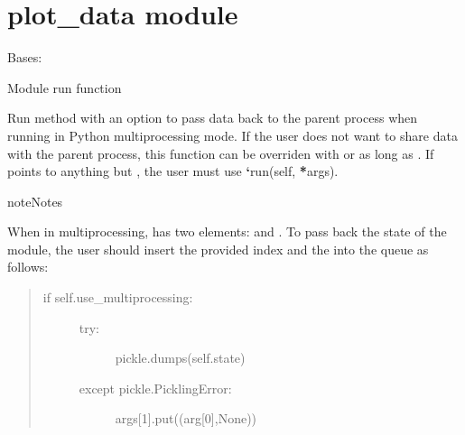 \documentclass[letterpaper,10pt,openany,oneside,english]{sphinxmanual}
\begin{document}
\section{plot\_data module}
\label{\detokenize{examples_rst/plot_data:module-plot_data}}\label{\detokenize{examples_rst/plot_data:plot-data-module}}\label{\detokenize{examples_rst/plot_data::doc}}

\begin{fulllineitems}
\label{\detokenize{examples_rst/plot_data:plot_data.PlotData}}
Bases: 

\begin{fulllineitems}
\label{\detokenize{examples_rst/plot_data:plot_data.PlotData.run}}
Module run function

Run method with an option to pass data back to the parent process when running
in Python multiprocessing mode. If the user does not want to share data with
the parent process, this function can be overriden with 
or  as long as .
If  points to anything but , the user must use
{\color{red}\bfseries{}{}`}run(self, {\color{red}\bfseries{}*}args).

\begin{sphinxadmonition}{note}{Notes}

When in multiprocessing,  has two elements:  and .
To pass back the state of the module, the user should insert the provided
index  and the  into the queue as follows:
\begin{quote}
\begin{description}
\item[{if self.use\_multiprocessing:}] \leavevmode\begin{description}
\item[{try:}] \leavevmode
pickle.dumps(self.state)

\item[{except pickle.PicklingError:}] \leavevmode
args{[}1{]}.put((arg{[}0{]},None))


\end{description}
\end{description}
\end{quote}
\end{sphinxadmonition}
\end{fulllineitems}
\end{fulllineitems}
\end{document}
